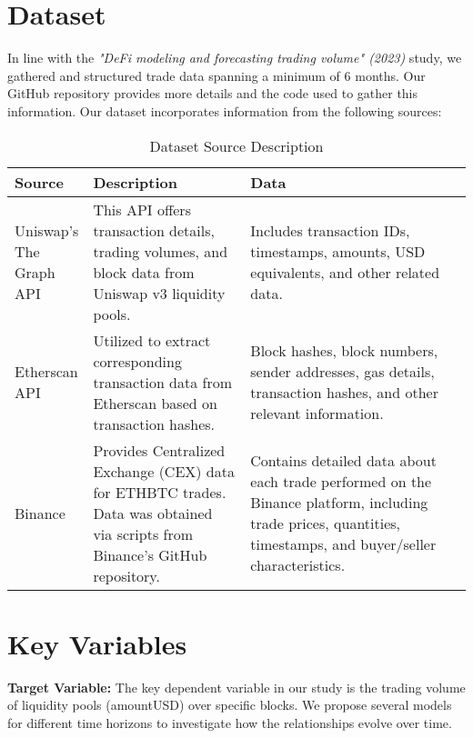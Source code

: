 \documentclass{article}
\begin{document}
\section*{\textbf{Dataset}}

In line with the \textit{"DeFi modeling and forecasting trading volume" (2023)} study\cite{Miori2023}, we gathered and structured trade data spanning a minimum of 6 months. Our GitHub repository provides more details and the code used to gather this information\cite{TeamRepo}. Our dataset incorporates information from the following sources:

\begin{table}[ht]
  \centering
  \small
  \begin{tabular}{|p{0.15\linewidth}|p{0.35\linewidth}|p{0.5\linewidth}|}
  \hline
  \textbf{Source} & \textbf{Description} & \textbf{Data} \\
  \hline
  Uniswap's The Graph API\cite{uniswapAPI} & This API offers transaction details, trading volumes, and block data from Uniswap v3 liquidity pools. & Includes transaction IDs, timestamps, amounts, USD equivalents, and other related data. \\
  \hline
  Etherscan API\cite{etherscanAPI} & Utilized to extract corresponding transaction data from Etherscan based on transaction hashes. & Block hashes, block numbers, sender addresses, gas details, transaction hashes, and other relevant information. \\
  \hline
  Binance\cite{binanceData} & Provides Centralized Exchange (CEX) data for ETHBTC trades. Data was obtained via scripts from Binance's GitHub repository. & Contains detailed data about each trade performed on the Binance platform, including trade prices, quantities, timestamps, and buyer/seller characteristics. \\
  \hline
  \end{tabular}
  \caption{Dataset Source Description}
  \label{tab:dataset-description}
  \end{table}


\section*{\textbf{Key Variables}}

\textbf{Target Variable:} The key dependent variable in our study is the trading volume of liquidity pools (amountUSD) over specific blocks. We propose several models for different time horizons to investigate how the relationships evolve over time.
\end{document}
